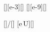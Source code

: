[\milli\volt][e-3][\volt]
[\nano\meter][e-9][\meter]

[]{\UX/\dmX}[\volt\per\meter]
[e\,U]{\UX}[\electronvolt]
